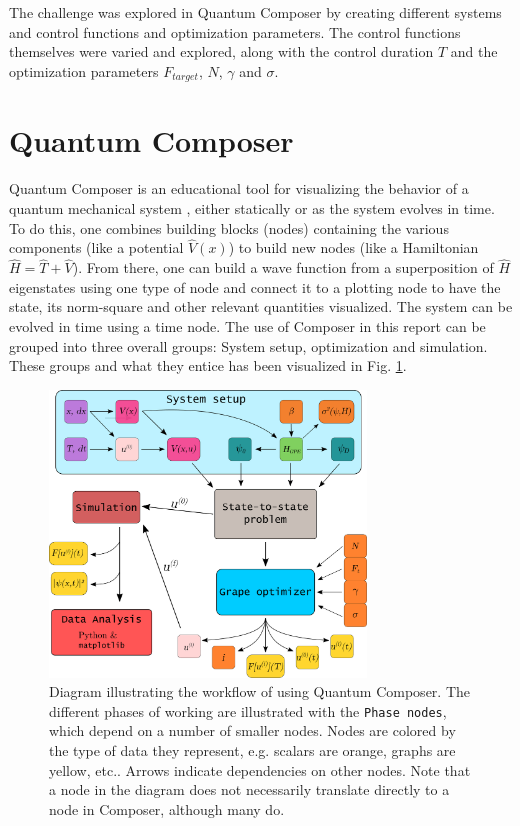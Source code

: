 \documentclass[a4paper, twocolumn]{revtex4-1}
\begin{document}
The challenge was explored in Quantum Composer by creating different systems and control functions and optimization parameters. The control functions themselves were varied and explored, along with the control duration $T$ and the  optimization parameters $F_{target}$, $N$, $\gamma$ and $\sigma$.

\section{Quantum Composer}\label{sec:Composer}
Quantum Composer is an educational tool for visualizing the behavior of a quantum mechanical system  \cite{ahmed2020quantum}, either statically or as the system evolves in time. To do this, one combines building blocks (nodes) containing the various components (like a potential $\hat{V}(x)$) to build new nodes (like a Hamiltonian $\hat{H} = \hat{T} + \hat{V}$). From there, one can build a wave function from a superposition of $\hat{H}$ eigenstates using one type of node and connect it to a plotting node to have the state, its norm-square and other relevant quantities visualized. The system can be evolved in time using a time node. The use of Composer in this report can be grouped into three overall groups: System setup,  optimization and simulation. These groups and what they entice has been visualized in Fig. \ref{fig:workflow-composer}. 

\begin{figure}
	\includegraphics[width=0.75\textwidth]{graphics/composerScreens/workflow-v2.pdf}
	\caption{Diagram illustrating the workflow of using Quantum Composer. The different phases of working are illustrated with the \texttt{Phase nodes}, which depend on a number of smaller nodes. Nodes are colored by the type of data they represent, e.g. scalars are orange, graphs are yellow, etc.. Arrows indicate dependencies on other nodes. Note that a node in the diagram does not necessarily translate directly to a node in Composer, although many do.}
	\label{fig:workflow-composer}
\end{figure}
\end{document}

